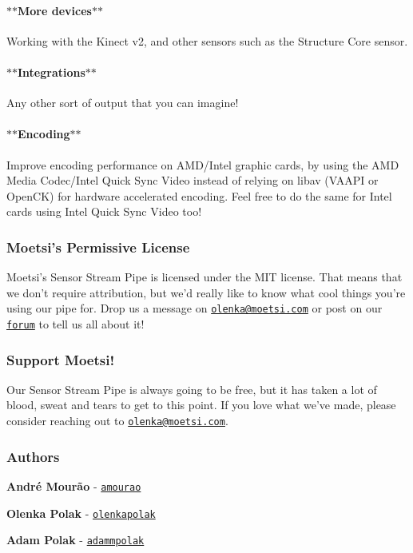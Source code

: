 \paragraph*{$\ast$$\ast$\+More devices$\ast$$\ast$}

Working with the Kinect v2, and other sensors such as the Structure Core sensor.

\paragraph*{$\ast$$\ast$\+Integrations$\ast$$\ast$}

Any other sort of output that you can imagine!

\paragraph*{$\ast$$\ast$\+Encoding$\ast$$\ast$}

Improve encoding performance on A\+M\+D/\+Intel graphic cards, by using the A\+MD Media Codec/\+Intel Quick Sync Video instead of relying on libav (V\+A\+A\+PI or Open\+CK) for hardware accelerated encoding. Feel free to do the same for Intel cards using Intel Quick Sync Video too!

\subsubsection*{Moetsi’s Permissive License}

Moetsi’s Sensor Stream Pipe is licensed under the M\+IT license. That means that we don’t require attribution, but we’d really like to know what cool things you’re using our pipe for. Drop us a message on \href{mailto:olenka@moetsi.com}{\tt olenka@moetsi.\+com} or post on our \href{https://moetsi.com/pages/community}{\tt forum} to tell us all about it!

\subsubsection*{Support Moetsi!}

Our Sensor Stream Pipe is always going to be free, but it has taken a lot of blood, sweat and tears to get to this point. If you love what we’ve made, please consider reaching out to \href{mailto:olenka@moetsi.com}{\tt olenka@moetsi.\+com}.

\subsubsection*{Authors}


\begin{DoxyItemize}
\item {\bfseries André Mourão} -\/ \href{https://github.com/amourao}{\tt amourao}
\item {\bfseries Olenka Polak} -\/ \href{https://github.com/olenkapolak}{\tt olenkapolak}
\item {\bfseries Adam Polak} -\/ \href{https://github.com/adammpolak}{\tt adammpolak} 
\end{DoxyItemize}